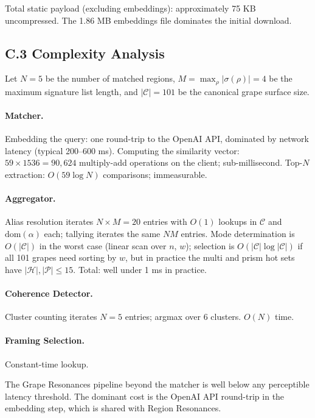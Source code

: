 \documentclass[11pt]{article}
\begin{document}
Total static payload (excluding embeddings): approximately 75 KB uncompressed. The 1.86 MB embeddings file dominates the initial download.

\subsection*{C.3 Complexity Analysis}
Let $N = 5$ be the number of matched regions, $M = \max_\rho |\sigma(\rho)| = 4$ be the maximum signature list length, and $|\mathcal{C}| = 101$ be the canonical grape surface size.

\paragraph{Matcher.} Embedding the query: one round-trip to the OpenAI API, dominated by network latency (typical 200--600 ms). Computing the similarity vector: $59 \times 1536 = 90{,}624$ multiply-add operations on the client; sub-millisecond. Top-$N$ extraction: $O(59 \log N)$ comparisons; immeasurable.

\paragraph{Aggregator.} Alias resolution iterates $N \times M = 20$ entries with $O(1)$ lookups in $\mathcal{C}$ and $\mathrm{dom}(\alpha)$ each; tallying iterates the same $N M$ entries. Mode determination is $O(|\mathcal{C}|)$ in the worst case (linear scan over $n$, $w$); selection is $O(|\mathcal{C}| \log |\mathcal{C}|)$ if all 101 grapes need sorting by $w$, but in practice the multi and prism hot sets have $|\mathcal{H}|, |\mathcal{P}| \leq 15$. Total: well under 1 ms in practice.

\paragraph{Coherence Detector.} Cluster counting iterates $N = 5$ entries; argmax over 6 clusters. $O(N)$ time.

\paragraph{Framing Selection.} Constant-time lookup.

The Grape Resonances pipeline beyond the matcher is well below any perceptible latency threshold. The dominant cost is the OpenAI API round-trip in the embedding step, which is shared with Region Resonances.
\end{document}
